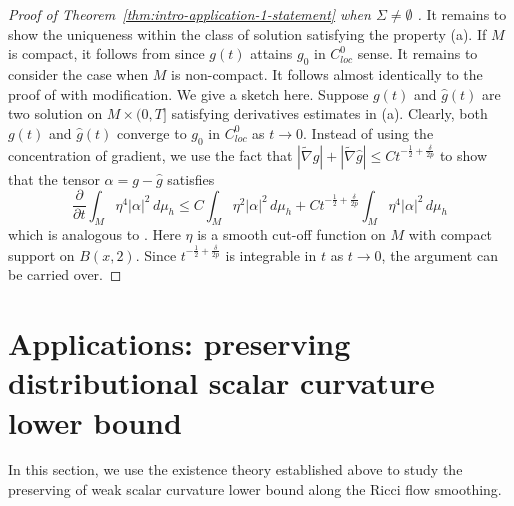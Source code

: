 \documentclass[12pt]{amsart}
\def\a{{\alpha}}
\theoremstyle{plain}
\theoremstyle{plain}
\theoremstyle{definition}
\theoremstyle{remark}
\numberwithin{equation}{subsection}
\newcommand{\hdel}{\tilde{\nabla}}
\begin{document}
\begin{proof}[Proof of Theorem~\ref{thm:intro-application-1-statement} when $\Sigma\neq \emptyset$ ]
It remains to show the uniqueness within the class of solution satisfying the property (a). If $M$ is compact, it follows from \cite{burkhardt-guim_pointwise_2019} since $g(t)$ attains $g_0$ in $C^0_{loc}$ sense.
It remains to consider the case when $M$ is non-compact. It follows almost identically to the proof of \cite[Theorem 3.1]{chu_ricci-deturck_2022} with modification. We give a sketch here. Suppose $g(t)$ and $\hat g(t)$ are two solution on $M\times (0,T]$ satisfying derivatives estimates in (a). Clearly, both $g(t)$ and $\hat g(t)$ converge to $g_0$ in $C^0_{loc}$ as $t\to 0$. Instead of using the concentration of gradient, we use the fact that $|\hdel g|+|\hdel \hat g|\leq Ct^{-\frac12 +\frac{\delta}{2p}}$ to show that the tensor $\a=g-\hat g$ satisfies 
\begin{equation}
\frac{\partial}{\partial t}\int_M \eta^4 |\a|^2 \,d\mu_h \leq C\int_M \eta^2 |\a|^2 \,d\mu_h +Ct^{-\frac12 +\frac{\delta}{2p}}\int_M \eta^4 |\a|^2 \,d\mu_h
\end{equation}
which  is analogous to \cite[(3.20)]{chu_ricci-deturck_2022}. Here $\eta$ is a smooth cut-off function on $M$ with compact support on $B(x,2)$. Since $t^{-\frac12 +\frac{\delta}{2p}}$ is integrable in $t$ as $t\to0$, the argument can be carried over.

\end{proof}

\section{Applications: preserving distributional scalar curvature lower bound}\label{sec:applications}

In this section, we use the existence theory established above to study the preserving of weak scalar curvature lower bound along the Ricci flow smoothing.
 
\end{document}
